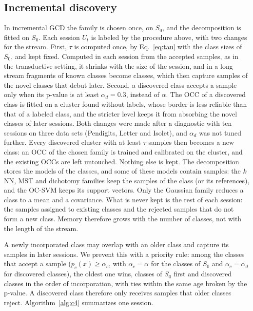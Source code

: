 \documentclass[pdflatex,sn-basic]{sn-jnl}
\begin{document}
\subsection{Incremental discovery}\label{sec:incremental}\label{sec:c4method}

In incremental GCD the family is chosen once, on $S_0$, and the decomposition is fitted on $S_0$. Each session $U_t$ is labeled by the procedure above, with two changes for the stream. First, $\tau$ is computed once, by Eq.~\eqref{eq:tau} with the class sizes of $S_0$, and kept fixed. Computed in each session from the accepted samples, as in the transductive setting, it shrinks with the size of the session, and in a long stream fragments of known classes become classes, which then capture samples of the novel classes that debut later. Second, a discovered class accepts a sample only when its p-value is at least $\alpha_d = 0.3$, instead of $\alpha$. The OCC of a discovered class is fitted on a cluster found without labels, whose border is less reliable than that of a labeled class, and the stricter level keeps it from absorbing the novel classes of later sessions. Both changes were made after a diagnostic with ten sessions on three data sets (Pendigits, Letter and Isolet), and $\alpha_d$ was not tuned further. Every discovered cluster with at least $\tau$ samples then becomes a new class: an OCC of the chosen family is trained and calibrated on the cluster, and the existing OCCs are left untouched. Nothing else is kept. The decomposition stores the models of the classes, and some of these models contain samples: the $k$NN, MST and dichotomy families keep the samples of the class (or its references), and the OC-SVM keeps its support vectors. Only the Gaussian family reduces a class to a mean and a covariance. What is never kept is the rest of each session: the samples assigned to existing classes and the rejected samples that do not form a new class. Memory therefore grows with the number of classes, not with the length of the stream.

A newly incorporated class may overlap with an older class and capture its samples in later sessions. We prevent this with a priority rule: among the classes that accept a sample ($p_c(x) \ge \alpha_c$, with $\alpha_c = \alpha$ for the classes of $S_0$ and $\alpha_c = \alpha_d$ for discovered classes), the oldest one wins, classes of $S_0$ first and discovered classes in the order of incorporation, with ties within the same age broken by the p-value. A discovered class therefore only receives samples that older classes reject. Algorithm~\ref{alg:c4} summarizes one session.
\end{document}
